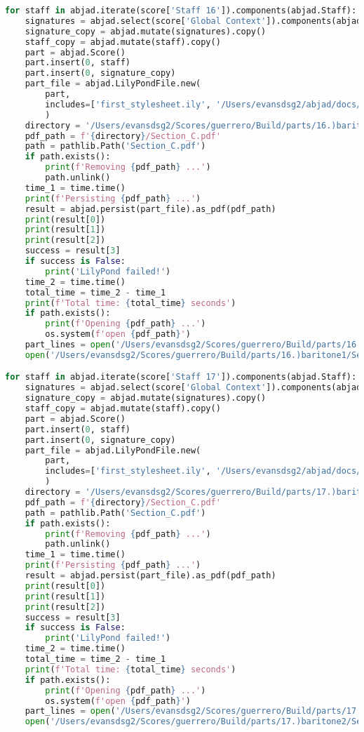 \begin{lstlisting}[language=Python, caption=Invocation Source Code]
for staff in abjad.iterate(score['Staff 16']).components(abjad.Staff):
    signatures = abjad.select(score['Global Context']).components(abjad.Staff)
    signature_copy = abjad.mutate(signatures).copy()
    staff_copy = abjad.mutate(staff).copy()
    part = abjad.Score()
    part.insert(0, staff)
    part.insert(0, signature_copy)
    part_file = abjad.LilyPondFile.new(
        part,
        includes=['first_stylesheet.ily', '/Users/evansdsg2/abjad/docs/source/_stylesheets/abjad.ily'],
        )
    directory = '/Users/evansdsg2/Scores/guerrero/Build/parts/16.)baritone1'
    pdf_path = f'{directory}/Section_C.pdf'
    path = pathlib.Path('Section_C.pdf')
    if path.exists():
        print(f'Removing {pdf_path} ...')
        path.unlink()
    time_1 = time.time()
    print(f'Persisting {pdf_path} ...')
    result = abjad.persist(part_file).as_pdf(pdf_path)
    print(result[0])
    print(result[1])
    print(result[2])
    success = result[3]
    if success is False:
        print('LilyPond failed!')
    time_2 = time.time()
    total_time = time_2 - time_1
    print(f'Total time: {total_time} seconds')
    if path.exists():
        print(f'Opening {pdf_path} ...')
        os.system(f'open {pdf_path}')
    part_lines = open('/Users/evansdsg2/Scores/guerrero/Build/parts/16.)baritone1/Section_C.ly').readlines()
    open('/Users/evansdsg2/Scores/guerrero/Build/parts/16.)baritone1/Section_C.ly', 'w').writelines(part_lines[15:-1])

for staff in abjad.iterate(score['Staff 17']).components(abjad.Staff):
    signatures = abjad.select(score['Global Context']).components(abjad.Staff)
    signature_copy = abjad.mutate(signatures).copy()
    staff_copy = abjad.mutate(staff).copy()
    part = abjad.Score()
    part.insert(0, staff)
    part.insert(0, signature_copy)
    part_file = abjad.LilyPondFile.new(
        part,
        includes=['first_stylesheet.ily', '/Users/evansdsg2/abjad/docs/source/_stylesheets/abjad.ily'],
        )
    directory = '/Users/evansdsg2/Scores/guerrero/Build/parts/17.)baritone2'
    pdf_path = f'{directory}/Section_C.pdf'
    path = pathlib.Path('Section_C.pdf')
    if path.exists():
        print(f'Removing {pdf_path} ...')
        path.unlink()
    time_1 = time.time()
    print(f'Persisting {pdf_path} ...')
    result = abjad.persist(part_file).as_pdf(pdf_path)
    print(result[0])
    print(result[1])
    print(result[2])
    success = result[3]
    if success is False:
        print('LilyPond failed!')
    time_2 = time.time()
    total_time = time_2 - time_1
    print(f'Total time: {total_time} seconds')
    if path.exists():
        print(f'Opening {pdf_path} ...')
        os.system(f'open {pdf_path}')
    part_lines = open('/Users/evansdsg2/Scores/guerrero/Build/parts/17.)baritone2/Section_C.ly').readlines()
    open('/Users/evansdsg2/Scores/guerrero/Build/parts/17.)baritone2/Section_C.ly', 'w').writelines(part_lines[15:-1])


\end{lstlisting}
